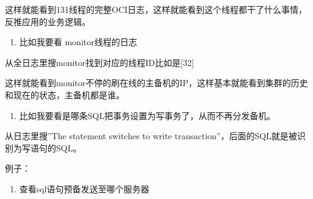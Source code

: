 \documentclass[letterpaper,10pt,english]{sphinxmanual}
\begin{document}
这样就能看到131线程的完整OCI日志，这样就能看到这个线程都干了什么事情，反推应用的业务逻辑。
\begin{enumerate}
%
\setcounter{enumi}{1}
\item {} 
比如我要看 monitor线程的日志

\end{enumerate}

从全日志里搜monitor找到对应的线程ID比如是{[}32{]}

\begin{sphinxVerbatim}[commandchars=\\\{\}]
 \PYG{l+s+s2}{[32}\PYG{l+s+s2}{]}   
\end{sphinxVerbatim}

这样就能看到monitor不停的刷在线的主备机的IP，这样基本就能看到集群的历史和现在的状态，主备机都是谁。
\begin{enumerate}
%
\setcounter{enumi}{2}
\item {} 
比如我要看是哪条SQL把事务设置为写事务了，从而不再分发备机。

\end{enumerate}

从日志里搜”The statement switches to write transaction”，后面的SQL就是被识别为写语句的SQL。

例子：

\begin{sphinxVerbatim}[commandchars=\\\{\}]
\PYG{p}{[}\PYG{p}{]}\PYG{p}{[} \PYG{p}{]}                 
\end{sphinxVerbatim}
\begin{enumerate}
%
\setcounter{enumi}{3}
\item {} 
查看sql语句预备发送至哪个服务器

\end{enumerate}
\end{document}
